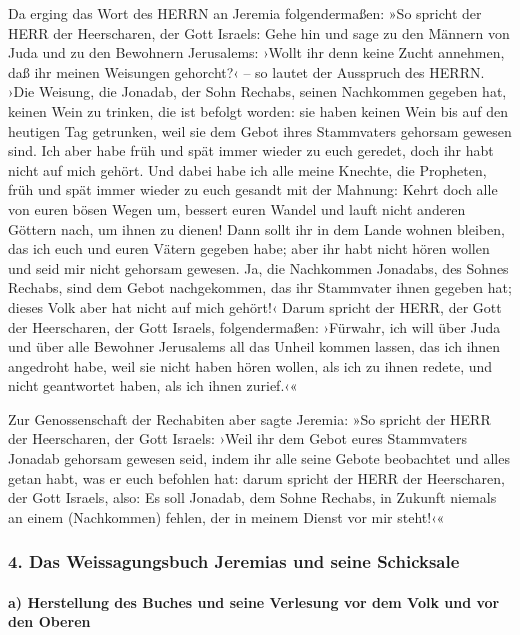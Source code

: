 Da erging das Wort des HERRN an Jeremia folgendermaßen:
»So spricht der HERR der Heerscharen, der Gott Israels:
Gehe hin und sage zu den Männern von Juda und zu den Bewohnern
Jerusalems: ›Wollt ihr denn keine Zucht annehmen, daß ihr meinen
Weisungen gehorcht?‹ -- so lautet der Ausspruch des HERRN.
›Die Weisung, die Jonadab, der Sohn Rechabs, seinen
Nachkommen gegeben hat, keinen Wein zu trinken, die ist befolgt worden:
sie haben keinen Wein bis auf den heutigen Tag getrunken, weil sie dem
Gebot ihres Stammvaters gehorsam gewesen sind. Ich aber habe früh und
spät immer wieder zu euch geredet, doch ihr habt nicht auf mich gehört.
Und dabei habe ich alle meine Knechte, die Propheten,
früh und spät immer wieder zu euch gesandt mit der Mahnung: Kehrt doch
alle von euren bösen Wegen um, bessert euren Wandel und lauft nicht
anderen Göttern nach, um ihnen zu dienen! Dann sollt ihr in dem Lande
wohnen bleiben, das ich euch und euren Vätern gegeben habe; aber ihr
habt nicht hören wollen und seid mir nicht gehorsam gewesen.
Ja, die Nachkommen Jonadabs, des Sohnes Rechabs, sind dem
Gebot nachgekommen, das ihr Stammvater ihnen gegeben hat; dieses Volk
aber hat nicht auf mich gehört!‹ Darum spricht der HERR,
der Gott der Heerscharen, der Gott Israels, folgendermaßen: ›Fürwahr,
ich will über Juda und über alle Bewohner Jerusalems all das Unheil
kommen lassen, das ich ihnen angedroht habe, weil sie nicht haben hören
wollen, als ich zu ihnen redete, und nicht geantwortet haben, als ich
ihnen zurief.‹«

Zur Genossenschaft der Rechabiten aber sagte Jeremia: »So
spricht der HERR der Heerscharen, der Gott Israels: ›Weil ihr dem Gebot
eures Stammvaters Jonadab gehorsam gewesen seid, indem ihr alle seine
Gebote beobachtet und alles getan habt, was er euch befohlen hat:
darum spricht der HERR der Heerscharen, der Gott Israels,
also: Es soll Jonadab, dem Sohne Rechabs, in Zukunft niemals an einem
(Nachkommen) fehlen, der in meinem Dienst vor mir steht!‹«

\hypertarget{das-weissagungsbuch-jeremias-und-seine-schicksale}{%
\subsubsection{4. Das Weissagungsbuch Jeremias und seine
Schicksale}\label{das-weissagungsbuch-jeremias-und-seine-schicksale}}

\hypertarget{a-herstellung-des-buches-und-seine-verlesung-vor-dem-volk-und-vor-den-oberen}{%
\paragraph{a) Herstellung des Buches und seine Verlesung vor dem Volk
und vor den
Oberen}\label{a-herstellung-des-buches-und-seine-verlesung-vor-dem-volk-und-vor-den-oberen}}

